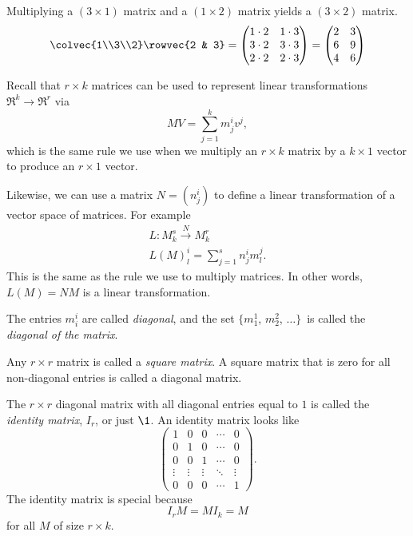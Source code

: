\begin{example}
Multiplying a $(3\times 1)$ matrix and a $(1\times 2)$ matrix yields a $(3\times 2)$ matrix.
\[
\colvec{1\\3\\2} \rowvec{2 & 3} = 
\begin{pmatrix}
1\cdot 2 & 1\cdot 3 \\
3\cdot 2 & 3\cdot 3 \\
2\cdot 2 & 2\cdot 3 \\
\end{pmatrix}
= \begin{pmatrix}
2 & 3 \\
6 & 9 \\
4 & 6 \\
\end{pmatrix}
\]
\end{example}


Recall that $r\times k$ matrices can be used to represent linear transformations 
$ \Re^k \rightarrow \Re^r $
via \[MV = \sum_{j=1}^{k} m_j^iv^j , \] which is the same rule we use when we multiply an $r\times k$ matrix by a $k\times 1$ vector to produce an $r\times1$ vector.

Likewise, we can use a matrix $N=(n^i_j)$ to define a linear transformation of a vector space of matrices. For example
\begin{gather*}
L \colon M^s_k \stackrel{N}{\longrightarrow} M^r_k
\\
L(M)^i_l = \sum_{j=1}^{s} n_j^im^j_l.
\end{gather*}
This is the same as the rule we use to multiply matrices. \hypertarget{leftmult}{In other words,} \(L(M)=NM\) is a linear transformation.

\begin{definition}
The entries $m_i^i$ are called \emph{diagonal}, and the set $\{m_1^1$, $m_2^2$, $\ldots \}$~is called the \emph{diagonal of the matrix}.

Any $r\times r$ matrix is called a \emph{square matrix}.  A square matrix that is zero for all non-diagonal entries is called a diagonal matrix.

The $r\times r$ diagonal matrix with all diagonal entries equal to $1$ is called the \emph{identity matrix}, $I_r$, or just $\1$.  An identity matrix looks like \[
\begin{pmatrix}
1 & 0 & 0 & \cdots & 0 \\
0 & 1 & 0 & \cdots & 0 \\
0 & 0 & 1 & \cdots & 0 \\
\vdots & \vdots & \vdots & \ddots & \vdots \\
0 & 0 & 0 & \cdots & 1
\end{pmatrix}.
\]
The identity matrix is special because \[I_rM=MI_k=M\] for all $M$ of size $r\times k$.
\end{definition}

